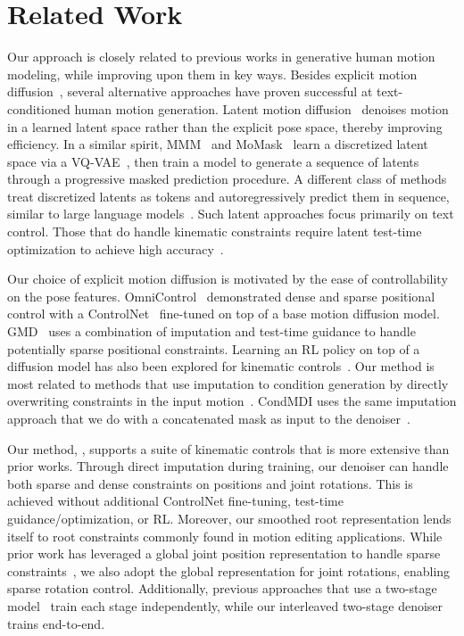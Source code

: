 \section{Related Work}
\label{sec:relwork}

Our approach is closely related to previous works in generative human motion modeling, while improving upon them in key ways.
Besides explicit motion diffusion~\cite{tevet2023mdm,zhang2024motiondiffuse}, several alternative approaches have proven successful at text-conditioned human motion generation. 
Latent motion diffusion~\cite{chen2023executing} denoises motion in a learned latent space rather than the explicit pose space, thereby improving efficiency. In a similar spirit, MMM~\cite{pinyoanuntapong2024mmm} and MoMask~\cite{guo2024momask} learn a discretized latent space via a VQ-VAE~\cite{van2017neural}, then train a model to generate a sequence of latents through a progressive masked prediction procedure. A different class of methods treat discretized latents as tokens and autoregressively predict them in sequence, similar to large language models~\cite{zhang2023generating,jiang2024motiongpt}. 
Such latent approaches focus primarily on text control. Those that do handle kinematic constraints require latent test-time optimization to achieve high accuracy~\cite{wan2024tlcontrol,pinyoanuntapong2025MaskControl}.

Our choice of explicit motion diffusion is motivated by the ease of controllability on the pose features.
OmniControl~\cite{xie2024omnicontrol} demonstrated dense and sparse positional control with a ControlNet~\cite{zhang2023adding} fine-tuned on top of a base motion diffusion model.
GMD~\cite{karunratanakul2023gmd} uses a combination of imputation and test-time guidance to handle potentially sparse positional constraints. Learning an RL policy on top of a diffusion model has also been explored for kinematic controls~\cite{shi2024amdm,zhao2025DartControl}.
Our method is most related to methods that use imputation to condition generation by directly overwriting constraints in the input motion~\cite{shafir2024human,hwang2025motion}.
CondMDI uses the same imputation approach that we do with a concatenated mask as input to the denoiser~\cite{cohan2024condmdi}.

Our method, \model, supports a suite of kinematic controls that is more extensive than prior works. Through direct imputation during training, our denoiser can handle both sparse and dense constraints on positions and joint rotations. This is achieved without additional ControlNet fine-tuning, test-time guidance/optimization, or RL. Moreover, our smoothed root representation lends itself to root constraints commonly found in motion editing applications.
While prior work has leveraged a global joint position representation to handle sparse constraints~\cite{karunratanakul2023gmd,cohan2024condmdi,hwang2025motion,meng2025absolute}, we also adopt the global representation for joint rotations, enabling sparse rotation control.
Additionally, previous approaches that use a two-stage model~\cite{karunratanakul2023gmd,hwang2025motion} train each stage independently, while our interleaved two-stage denoiser trains end-to-end.

